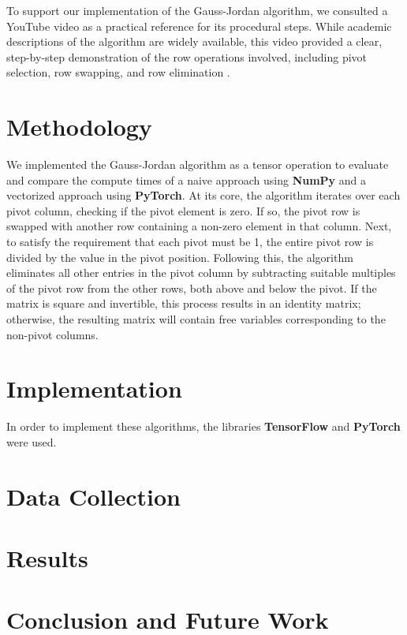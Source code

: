 \documentclass[12pt]{article}
\begin{document}
To support our implementation of the Gauss-Jordan algorithm, we consulted a YouTube video as a practical reference for its procedural steps. While academic descriptions of the algorithm are widely available, this video provided a clear, step-by-step demonstration of the row operations involved, including pivot selection, row swapping, and row elimination \cite{gaussjordan_video}.

\section{Methodology}

We implemented the Gauss-Jordan algorithm as a tensor operation to evaluate and compare the compute times of a naive approach using \textbf{NumPy} and a vectorized approach using \textbf{PyTorch}. At its core, the algorithm iterates over each pivot column, checking if the pivot element is zero. If so, the pivot row is swapped with another row containing a non-zero element in that column. Next, to satisfy the requirement that each pivot must be 1, the entire pivot row is divided by the value in the pivot position. Following this, the algorithm eliminates all other entries in the pivot column by subtracting suitable multiples of the pivot row from the other rows, both above and below the pivot. If the matrix is square and invertible, this process results in an identity matrix; otherwise, the resulting matrix will contain free variables corresponding to the non-pivot columns.

\section{Implementation}

In order to implement these algorithms, the libraries \textbf{TensorFlow} and \textbf{PyTorch} were used.
\hfill\break

\lstset{style=mystyle}


\section{Data Collection}

\section{Results}

\section{Conclusion and Future Work}

\newpage


\end{document}

